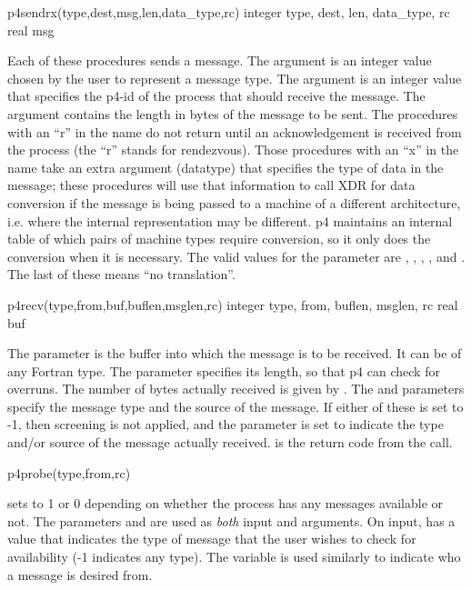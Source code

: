 \begin{example}
p4sendrx(type,dest,msg,len,data_type,rc)
integer type, dest, len, data_type, rc
real msg
\end{example}
\noindent
Each of these procedures sends a message.  The  argument
is an integer value chosen by the user to represent a message type.  The
 argument is an integer value that specifies the p4-id of the
process that should receive the message.  The  argument contains the
length in bytes of the message to be sent.  The procedures with an ``r'' in
the name do not return until an acknowledgement is received from the 
process (the ``r'' stands for rendezvous).  Those procedures with an ``x'' in
the name take an extra argument (datatype) that specifies the type of data in
the message; these procedures will use that information to call XDR for data
conversion if the message is being passed to a machine of a different
architecture, i.e. where the internal representation may be different.  p4
maintains an internal table of which pairs of machine types require
conversion, so it only does the conversion when it is necessary.  The valid
values for the  parameter are , ,
, , and .  The last of these means ``no
translation''.

\begin{example}
p4recv(type,from,buf,buflen,msglen,rc)
integer type, from, buflen, msglen, rc
real buf
\end{example}
\noindent
The  parameter is the buffer into which the message is to
be received.  It can be of any Fortran type.  The  parameter
specifies its length, so that p4 can check for overruns.  The number of bytes
actually received is given by .  The  and 
parameters specify the message type and the source of the message.  If either
of these is set to -1, then screening is not applied, and the parameter is set
to indicate the type and/or source of the message actually received.
 is the return code from the call.

\begin{example}
p4probe(type,from,rc)
\end{example}
\noindent
sets  to 1 or 0 depending on whether the process has any
messages available or not.  The parameters  and  are
used as {\em both} input and arguments.  On input,  has a value
that indicates the type of message that the user wishes to check for
availability (-1 indicates any type).  The variable  is used
similarly to indicate who a message is desired from.

